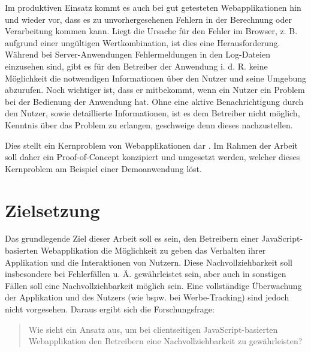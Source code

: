 Im produktiven Einsatz kommt es auch bei gut getesteten Webapplikationen hin und wieder vor, dass es zu unvorhergesehenen Fehlern in der Berechnung oder Verarbeitung kommen kann. Liegt die Ursache für den Fehler im Browser, z. B. aufgrund einer ungültigen Wertkombination, ist dies eine Herausforderung. Während bei Server-Anwendungen Fehlermeldungen in den Log-Dateien einzusehen sind, gibt es für den Betreiber der Anwendung i. d. R. keine Möglichkeit die notwendigen Informationen über den Nutzer und seine Umgebung abzurufen. Noch wichtiger ist, dass er mitbekommt, wenn ein Nutzer ein Problem bei der Bedienung der Anwendung hat. Ohne eine aktive Benachrichtigung durch den Nutzer, sowie detaillierte Informationen, ist es dem Betreiber nicht möglich, Kenntnis über das Problem zu erlangen, geschweige denn dieses nachzustellen.

Dies stellt ein Kernproblem von  Webapplikationen dar \cite{ClientSideMonitoringOfDistributedSystems}. Im Rahmen der Arbeit soll daher ein Proof-of-Concept konzipiert und umgesetzt werden, welcher dieses Kernproblem am Beispiel einer Demoanwendung löst.

\section{Zielsetzung}

Das grundlegende Ziel dieser Arbeit soll es sein, den Betreibern einer JavaScript-basierten Webapplikation die Möglichkeit zu geben das Verhalten ihrer Applikation und die Interaktionen von Nutzern. Diese Nachvollziehbarkeit soll insbesondere bei Fehlerfällen u. Ä. gewährleistet sein, aber auch in sonstigen Fällen soll eine Nachvollziehbarkeit möglich sein. Eine vollständige Überwachung der Applikation und des Nutzers (wie bspw. bei Werbe-Tracking) sind jedoch nicht vorgesehen. Daraus ergibt sich die Forschungsfrage:

\begin{quotation}
	Wie sieht ein Ansatz aus, um bei clientseitigen JavaScript-basierten Webapplikation den Betreibern eine Nachvollziehbarkeit zu gewährleisten?
\end{quotation}

